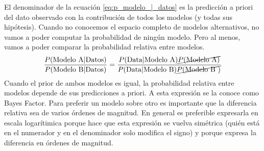 \documentclass[a4paper,10pt]{book}
\theoremstyle{definition}
\begin{document}
El denominador de la ecuaci\'on \ref{eq:p_modelo_|_datos} es la predicci\'on a priori del dato observado con la contribuci\'on de todos los modelos (y todas sus hip\'otesis).
%
Cuando no conocemos el espacio completo de modelos alternativos, no vamos a poder computar la probabilidad de ningún modelo.
%
Pero al menos, vamos a poder comparar la probabilidad relativa entre modelos.
%
 \begin{equation}
\begin{split}
 \frac{P(\text{Modelo A}|\text{Datos})}{P(\text{Modelo B}|\text{Datos})} = \frac{P(\text{Data}|\text{Modelo A})\cancel{P(\text{Modelo A})}}{P(\text{Data}|\text{Modelo B})\cancel{P(\text{Modelo B })}}
\end{split}
\end{equation}
%
Cuando el prior de ambos modelos es igual, la probabilidad relativa entre modelos depende de sus predicciones a priori.
%
A esta expresi\'on se la conoce como Bayes Factor.
%
Para preferir un modelo sobre otro es importante que la diferencia relativa sea de varios \'ordenes de magnitud.
%
En general es preferible expresarla en escala logar\'itimica porque hace que esta expresi\'on se vuelva sim\'etrica (qui\'en est\'a en el numerador y en el denominador solo modifica el signo) y porque expresa la diferencia en \'ordenes de magnitud.

\end{document}
